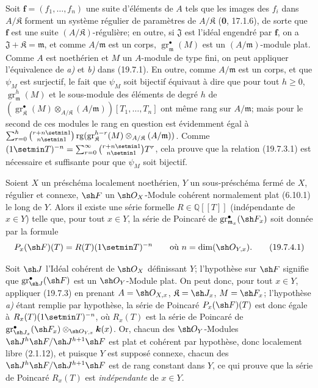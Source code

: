 Soit $\mathbf f=(f_1,\ldots,f_n)$ une suite d'éléments de $A$ tels que les images des $f_i$ dans $A/\mathfrak K$ forment un système régulier de paramètres de $A/\mathfrak K$ (\textbf{0}, 17.1.6), de sorte que $\mathbf f$ est une suite $(A/\mathfrak K)$-régulière; en outre, si $\mathfrak J$ est l'idéal engendré par $\mathbf f$, on a $\mathfrak J+\mathfrak K=\mathfrak m$, et comme $A/\mathfrak m$ est un corps, $\operatorname{gr}_{\mathfrak m}^\bullet(M)$ est un $(A/\mathfrak m)$-module plat. Comme $A$ est noethérien et $M$ un $A$-module de type fini, on peut appliquer l'équivalence de \emph{a)} et \emph{b)} dans (19.7.1). En outre, comme $A/\mathfrak m$ est un corps, et que $\psi_M$ est surjectif, le fait que $\psi_M$ soit bijectif équivaut à dire que pour tout $h\geq0$, $\operatorname{gr}_{\mathfrak m}^h(M)$ et le sous-module des éléments de degré $h$ de $(\operatorname{gr}_{\mathfrak K}^\bullet(M)\otimes_{A/\mathfrak K}(A/\mathfrak m))[T_1,\ldots,T_n]$ ont même rang sur $A/\mathfrak m$; mais pour le second de ces modules le rang en question est évidemment égal à $\sum_{r=0}^h\binom{r+n\setmin 1}{n\setmin 1}\operatorname{rg}(\operatorname{gr}_{\mathfrak K}^{h-r}(M)\otimes_{A/\mathfrak K}(A/\mathfrak m))$. Comme $(1\setmin T)^{-n}=\sum_{r=0}^{\infty}\binom{r+n\setmin 1}{n\setmin 1}T^r$, cela prouve que la relation (19.7.3.1) est nécessaire et suffisante pour que $\psi_M$ soit bijectif.

\begin{corollary}[19.7.4]
\label{IV.19.7.4}
Soient $X$ un préschéma localement noethérien, $Y$ un sous-préschéma fermé de $X$, régulier et connexe, $\sh F$ un $\sh O_X$-Module cohérent normalement plat \textup{(6.10.1)} le long de $Y$. Alors il existe une série formelle $R\in\mathbb{Q}[[T]]$ \textup{(indépendante de $x\in Y$)} telle que, pour tout $x\in Y$, la série de Poincaré de $\operatorname{gr}_{\mathfrak m_x}^\bullet(\sh F_x)$ soit donnée par la formule
\begin{equation}
  P_x(\sh F)(T)=R(T)(1\setmin T)^{-n}\qquad\text{où }n=\dim(\sh O_{Y,x}).
  \tag{19.7.4.1}\label{IV.19.7.4.1}
\end{equation}
\end{corollary}


Soit $\sh J$ l'Idéal cohérent de $\sh O_X$ définissant $Y$; l'hypothèse sur $\sh F$ signifie que $\operatorname{gr}_{\sh J}^\bullet(\sh F)$ est un $\sh O_Y$-Module plat. On peut donc, pour tout $x\in Y$, appliquer (19.7.3) en prenant $A=\sh O_{X,x}$, $\mathfrak K=\sh J_x$, $M=\sh F_x$; l'hypothèse \emph{a)} étant remplie par hypothèse, la série de Poincaré $P_x(\sh F)(T)$ est donc égale à $R_x(T)(1\setmin T)^{-n}$, où $R_x(T)$ est la série de Poincaré de $\operatorname{gr}_{\sh J_x}^\bullet(\sh F_x)\otimes_{\sh O_{Y,x}}\boldsymbol{k}(x)$. Or, chacun des $\sh O_Y$-Modules $\sh J^h\sh F/\sh J^{h+1}\sh F$ est plat et cohérent par hypothèse, donc localement libre (2.1.12), et puisque $Y$ est supposé connexe, chacun des $\sh J^h\sh F/\sh J^{h+1}\sh F$ est de rang constant dans $Y$, ce qui prouve que la série de Poincaré $R_x(T)$ est \emph{indépendante} de $x\in Y$.


